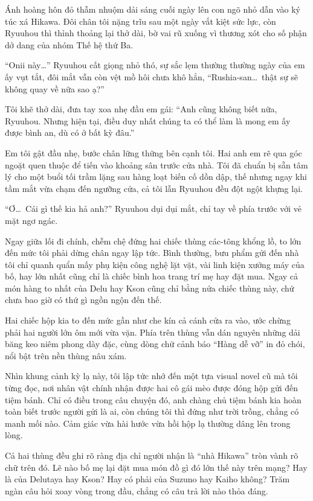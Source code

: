 ﻿\documentclass[../main.tex]{subfiles}
\begin{document}
Ánh hoàng hôn đỏ thẫm nhuộm dải sáng cuối ngày lên con ngõ nhỏ dẫn vào ký túc xá Hikawa. Đôi chân tôi nặng trĩu sau một ngày vắt kiệt sức lực, còn Ryuuhou thì thỉnh thoảng lại thở dài, bờ vai rũ xuống vì thương xót cho số phận dở dang của nhóm Thế hệ thứ Ba.

``Onii này\dots'' Ryuuhou cất giọng nhỏ thó, sự sắc lẹm thường thường ngày của em ấy vụt tắt, đôi mắt vẫn còn vệt mồ hôi chưa khô hẳn, ``Rushia-san\dots\ thật sự sẽ không quay về nữa sao ạ?''

Tôi khẽ thở dài, đưa tay xoa nhẹ đầu em gái: ``Anh cũng không biết nữa, Ryuuhou. Nhưng hiện tại, điều duy nhất chúng ta có thể làm là mong em ấy được bình an, dù có ở bất kỳ đâu.''

Em tôi gật đầu nhẹ, bước chân lững thững bên cạnh tôi. Hai anh em rẽ qua góc ngoặt quen thuộc để tiến vào khoảng sân trước cửa nhà. Tôi đã chuẩn bị sẵn tâm lý cho một buổi tối trầm lặng sau hàng loạt biến cố dồn dập, thế nhưng ngay khi tầm mắt vừa chạm đến ngưỡng cửa, cả tôi lẫn Ryuuhou đều đột ngột khựng lại.

``Ơ\dots\ Cái gì thế kia hả anh?'' Ryuuhou dụi dụi mắt, chỉ tay về phía trước với vẻ mặt ngơ ngác.

Ngay giữa lối đi chính, chễm chệ đứng hai chiếc thùng các-tông khổng lồ, to lớn đến mức tôi phải dừng chân ngay lập tức. Bình thường, bưu phẩm gửi đến nhà tôi chỉ quanh quẩn mấy phụ kiện công nghệ lặt vặt, vài linh kiện xưởng máy của bố, hay lớn nhất cũng chỉ là chiếc bình hoa trang trí mẹ hay đặt mua. Ngay cả món hàng to nhất của Delu hay Kson cũng chỉ bằng nửa chiếc thùng này, chứ chưa bao giờ có thứ gì ngồn ngộn đến thế.

Hai chiếc hộp kia to đến mức gần như che kín cả cánh cửa ra vào, ước chừng phải hai người lớn ôm mới vừa vặn. Phía trên thùng vẫn dán nguyên những dải băng keo niêm phong dày đặc, cùng dòng chữ cảnh báo ``Hàng dễ vỡ'' in đỏ chói, nổi bật trên nền thùng nâu xám.

Nhìn khung cảnh kỳ lạ này, tôi lập tức nhớ đến một tựa visual novel cũ mà tôi từng đọc, nơi nhân vật chính nhận được hai cô gái mèo được đóng hộp gửi đến tiệm bánh. Chỉ có điều trong câu chuyện đó, anh chàng chủ tiệm bánh kia hoàn toàn biết trước người gửi là ai, còn chúng tôi thì đứng như trời trồng, chẳng có manh mối nào. Cảm giác vừa hài hước vừa hồi hộp lạ thường dâng lên trong lòng.

Cả hai thùng đều ghi rõ ràng địa chỉ người nhận là ``nhà Hikawa'' tròn vành rõ chữ trên đó. Lẽ nào bố mẹ lại đặt mua món đồ gì đó lớn thế này trên mạng? Hay là của Delutaya hay Kson? Hay có phải của Suzuno hay Kaiho không? Trăm ngàn câu hỏi xoay vòng trong đầu, chẳng có câu trả lời nào thỏa đáng.
\end{document}
